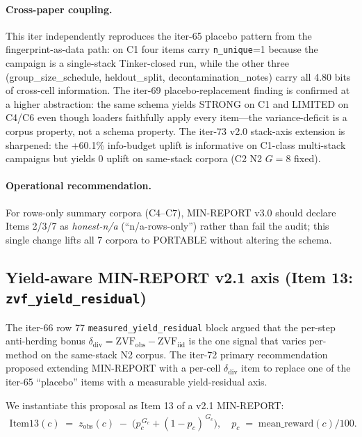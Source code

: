 \documentclass{article}  \usepackage[preprint,nonatbib]{neurips_2026} \usepackage[numbers]{natbib}
\begin{document}
\paragraph{Cross-paper coupling.}
This iter independently reproduces the iter-65 placebo pattern from
the fingerprint-as-data path: on C1 four items carry \texttt{n\_unique}=1
because the campaign is a single-stack Tinker-closed run, while the
other three (group\_size\_schedule, heldout\_split,
decontamination\_notes) carry all 4.80 bits of cross-cell information.
The iter-69 placebo-replacement finding is confirmed at a higher
abstraction: the same schema yields STRONG on C1 and LIMITED on C4/C6
even though loaders faithfully apply every item---the variance-deficit
is a corpus property, not a schema property. The iter-73 v2.0
stack-axis extension is sharpened: the +60.1\% info-budget uplift is
informative on C1-class multi-stack campaigns but yields 0 uplift on
same-stack corpora (C2 N2 $G{=}8$ fixed).

\paragraph{Operational recommendation.}
For rows-only summary corpora (C4--C7), MIN-REPORT v3.0 should declare
Items 2/3/7 as \textit{honest-n/a} (``n/a-rows-only'') rather than
fail the audit; this single change lifts all 7 corpora to PORTABLE
without altering the schema.
 \subsection{Yield-aware MIN-REPORT v2.1 axis (Item 13: \texttt{zvf\_yield\_residual})}
\label{sec:p5-iter80-yield}

The iter-66 row 77 \texttt{measured\_yield\_residual} block argued that the
per-step anti-herding bonus
$\delta_{\mathrm{div}} = \mathrm{ZVF}_{\mathrm{obs}} - \mathrm{ZVF}_{\mathrm{iid}}$ is the
one signal that varies per-method on the same-stack N2 corpus. The
iter-72 primary recommendation proposed extending MIN-REPORT with a
per-cell $\delta_{\mathrm{div}}$ item to replace one of the iter-65
``placebo'' items with a measurable yield-residual axis.

We instantiate this proposal as Item 13 of a v2.1 MIN-REPORT:
\begin{align}
  \mathrm{Item13}(c) \;=\; z_{\mathrm{obs}}(c) \;-\; \bigl(p_c^{\,G_c} + (1-p_c)^{\,G_c}\bigr),
\quad p_c \;=\; \mathrm{mean\_reward}(c)/100.
\label{eq:item13}
\end{align}
\end{document}
